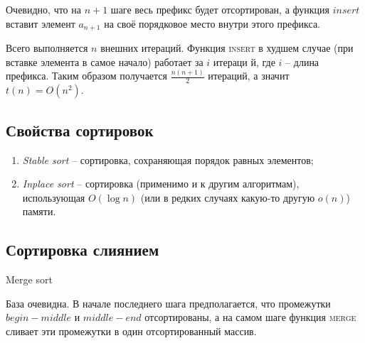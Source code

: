    \begin{proof_cor}
        Очевидно, что на $n + 1$ шаге весь префикс будет отсортирован, а функция $insert$ вставит элемент $a_{n+1}$ на своё порядковое место внутри этого префикса.
    \end{proof_cor}

    \begin{time}
        Всего выполняется $n$ внешних итераций. Функция \textsc{insert} в худшем случае (при вставке элемента в самое начало) работает за $i$ итераци
        й, где $i$ -- длина префикса. Таким образом получается $\frac{n(n+1)}{2}$ итераций, а значит $t(n) = O(n^2)$. 
    \end{time}

\subsection{Свойства сортировок}
    \begin{enumerate}
        \item \textit{Stable sort} -- сортировка, сохраняющая порядок равных элементов;
        \item \textit{Inplace sort} -- сортировка (применимо и к другим алгоритмам), использующая $O(\log n)$ (или в редких случаях какую-то другую $o(n)$) памяти.
    \end{enumerate}

\subsection{Сортировка слиянием}
    \begin{algorithm}
        \caption{Merge sort}
        \begin{algorithmic}
                \State {}
                \State {}
                \State {} 
                \State {}
            \EndFunction
        \end{algorithmic}
    \end{algorithm}

    \begin{proof_cor}
        База очевидна. В начале последнего шага предполагается, что промежутки $begin-middle$ и $middle-end$ отсортированы, а на самом шаге функция \textsc{merge} сливает эти промежутки в один отсортированный массив.
    \end{proof_cor}

